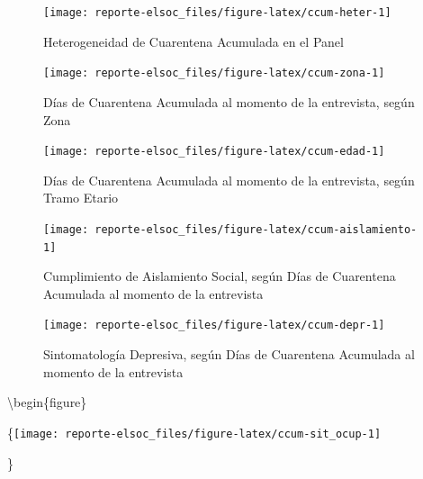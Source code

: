\documentclass[
  12pt,
  openany]{book}
\begin{document}
\begin{figure}

{\centering \texttt{[image: reporte-elsoc\_files/figure-latex/ccum-heter-1]} 

}

\caption{Heterogeneidad de Cuarentena Acumulada en el Panel}\label{fig:ccum-heter}
\end{figure}

\begin{figure}

{\centering \texttt{[image: reporte-elsoc\_files/figure-latex/ccum-zona-1]} 

}

\caption{Días de Cuarentena Acumulada al momento de la entrevista, según Zona}\label{fig:ccum-zona}
\end{figure}

\begin{figure}

{\centering \texttt{[image: reporte-elsoc\_files/figure-latex/ccum-edad-1]} 

}

\caption{Días de Cuarentena Acumulada al momento de la entrevista, según Tramo Etario}\label{fig:ccum-edad}
\end{figure}

\begin{figure}

{\centering \texttt{[image: reporte-elsoc\_files/figure-latex/ccum-aislamiento-1]} 

}

\caption{Cumplimiento de Aislamiento Social, según Días de Cuarentena Acumulada al momento de la entrevista}\label{fig:ccum-aislamiento}
\end{figure}

\begin{figure}

{\centering \texttt{[image: reporte-elsoc\_files/figure-latex/ccum-depr-1]} 

}

\caption{Sintomatología Depresiva, según Días de Cuarentena Acumulada al momento de la entrevista}\label{fig:ccum-depr}
\end{figure}

\textbackslash begin\{figure\}

\{\centering \texttt{[image: reporte-elsoc\_files/figure-latex/ccum-sit\_ocup-1]}

\}

\caption{Situación Ocupacional, según Días de Cuarentena Acumulada al momento de la entrevista}
\end{document}
